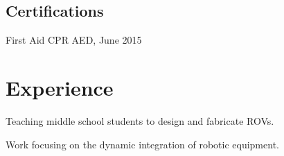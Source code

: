 \documentclass[letterpaper]{deedy-resume} %
\begin{document}
\begin{minipage}[t]{0.39\textwidth}
\sectionspace %

\subsection{Certifications}
First Aid CPR AED, June 2015



\end{minipage} %
\hfill
%
%
\begin{minipage}[t]{0.58\textwidth} %


\section{Experience}


\vspace{\topsep} %
\begin{tightitemize}
\item Teaching middle school students to design and fabricate ROVs.
\end{tightitemize}

\sectionspace %



\begin{tightitemize}
\item Work focusing on the dynamic integration of robotic equipment.
\end{tightitemize}

\sectionspace %



\end{minipage}
\end{document}
